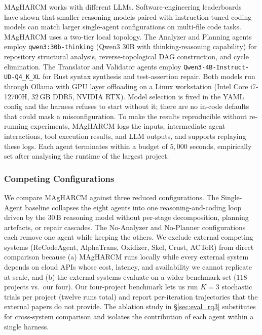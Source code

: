 MAgHARCM works with different LLMs. Software-engineering
leaderboards~\cite{leaderboards2025} have shown that smaller reasoning
models paired with instruction-tuned coding models can match larger
single-agent configurations on multi-file code tasks. MAgHARCM uses a
two-tier local topology. The Analyzer and Planning agents employ
\texttt{qwen3:30b-thinking} (Qwen3 30B with thinking-reasoning
capability) for repository structural analysis, reverse-topological
DAG construction, and cycle elimination. The Translator and Validator
agents employ \texttt{Qwen3-4B-Instruct-UD-Q4\_K\_XL} for Rust syntax
synthesis and test-assertion repair. Both models run through Ollama
with GPU layer offloading on a Linux workstation (Intel Core i7-12700H,
$32\,\text{GB}$ DDR5, NVIDIA RTX). Model selection is fixed in the
YAML config and the harness refuses to start without it; there are
no in-code defaults that could mask a misconfiguration. To make the
results reproducible without re-running experiments, MAgHARCM logs the
inputs, intermediate agent interactions, tool execution results, and
LLM outputs, and supports replaying these logs. Each agent terminates
within a budget of $5{,}000$ seconds, empirically set after analysing
the runtime of the largest project.

\subsubsection{Competing Configurations}
\label{sec:eval_baselines}

We compare MAgHARCM against three reduced configurations. The
Single-Agent baseline collapses the eight agents into one
reasoning-and-coding loop driven by the $30\,\text{B}$ reasoning model
without per-stage decomposition, planning artefacts, or repair
cascades. The No-Analyzer and No-Planner configurations each remove
one agent while keeping the others. We exclude external competing
systems (ReCodeAgent, AlphaTrans, Oxidizer, Skel, Crust, ACToR) from
direct comparison because (a) MAgHARCM runs locally while every
external system depends on cloud APIs whose cost, latency, and
availability we cannot replicate at scale, and (b) the external
systems evaluate on a wider benchmark set ($118$ projects vs.\ our
four). Our four-project benchmark lets us run $K{=}3$ stochastic
trials per project (twelve runs total) and report per-iteration
trajectories that the external papers do not provide. The ablation
study in §\ref{sec:eval_rq3} substitutes for cross-system comparison
and isolates the contribution of each agent within a single harness.

